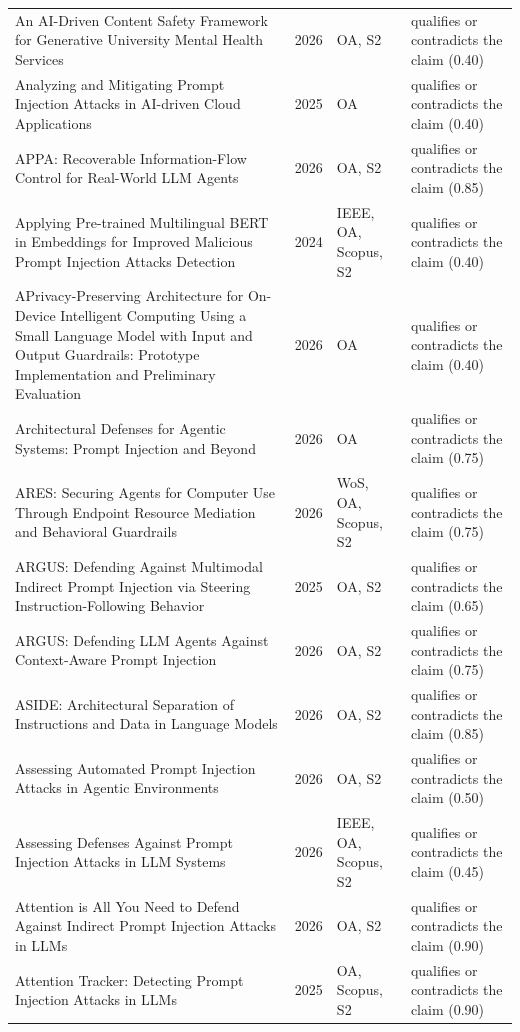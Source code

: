 \begin{longtable}{@{}%
  >{\raggedright\arraybackslash}p{}c%
  >{\raggedright\arraybackslash}p{}%
  >{\raggedright\arraybackslash}p{}@{}}
An AI-Driven Content Safety Framework for Generative University Mental Health Services & 2026 & OA, S2 & qualifies or contradicts the claim (0.40) \\
Analyzing and Mitigating Prompt Injection Attacks in AI-driven Cloud Applications & 2025 & OA & qualifies or contradicts the claim (0.40) \\
APPA: Recoverable Information-Flow Control for Real-World LLM Agents & 2026 & OA, S2 & qualifies or contradicts the claim (0.85) \\
Applying Pre-trained Multilingual BERT in Embeddings for Improved Malicious Prompt Injection Attacks Detection & 2024 & IEEE, OA, Scopus, S2 & qualifies or contradicts the claim (0.40) \\
APrivacy-Preserving Architecture for On-Device Intelligent Computing Using a Small Language Model with Input and Output Guardrails: Prototype Implementation and Preliminary Evaluation & 2026 & OA & qualifies or contradicts the claim (0.40) \\
Architectural Defenses for Agentic Systems: Prompt Injection and Beyond & 2026 & OA & qualifies or contradicts the claim (0.75) \\
ARES: Securing Agents for Computer Use Through Endpoint Resource Mediation and Behavioral Guardrails & 2026 & WoS, OA, Scopus, S2 & qualifies or contradicts the claim (0.75) \\
ARGUS: Defending Against Multimodal Indirect Prompt Injection via Steering Instruction-Following Behavior & 2025 & OA, S2 & qualifies or contradicts the claim (0.65) \\
ARGUS: Defending LLM Agents Against Context-Aware Prompt Injection & 2026 & OA, S2 & qualifies or contradicts the claim (0.75) \\
ASIDE: Architectural Separation of Instructions and Data in Language Models & 2026 & OA, S2 & qualifies or contradicts the claim (0.85) \\
Assessing Automated Prompt Injection Attacks in Agentic Environments & 2026 & OA, S2 & qualifies or contradicts the claim (0.50) \\
Assessing Defenses Against Prompt Injection Attacks in LLM Systems & 2026 & IEEE, OA, Scopus, S2 & qualifies or contradicts the claim (0.45) \\
Attention is All You Need to Defend Against Indirect Prompt Injection Attacks in LLMs & 2026 & OA, S2 & qualifies or contradicts the claim (0.90) \\
Attention Tracker: Detecting Prompt Injection Attacks in LLMs & 2025 & OA, Scopus, S2 & qualifies or contradicts the claim (0.90) \\

\end{longtable}
